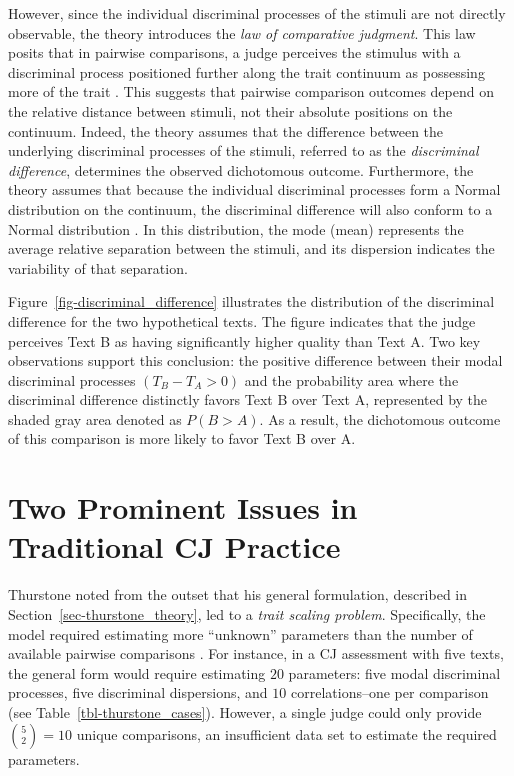 \documentclass[
  authoryear,
  review,
  1p]{elsarticle}
\begin{document}
However, since the individual discriminal processes of the stimuli are
not directly observable, the theory introduces the \emph{law of
comparative judgment}. This law posits that in pairwise comparisons, a
judge perceives the stimulus with a discriminal process positioned
further along the trait continuum as possessing more of the trait
\citep{Bramley_2008}. This suggests that pairwise comparison outcomes
depend on the relative distance between stimuli, not their absolute
positions on the continuum. Indeed, the theory assumes that the
difference between the underlying discriminal processes of the stimuli,
referred to as the \emph{discriminal difference}, determines the
observed dichotomous outcome. Furthermore, the theory assumes that
because the individual discriminal processes form a Normal distribution
on the continuum, the discriminal difference will also conform to a
Normal distribution \citep{Andrich_1978}. In this distribution, the mode
(mean) represents the average relative separation between the stimuli,
and its dispersion indicates the variability of that separation.

Figure~\ref{fig-discriminal_difference} illustrates the distribution of
the discriminal difference for the two hypothetical texts. The figure
indicates that the judge perceives Text B as having significantly higher
quality than Text A. Two key observations support this conclusion: the
positive difference between their modal discriminal processes
\((T_{B} - T_{A} > 0)\) and the probability area where the discriminal
difference distinctly favors Text B over Text A, represented by the
shaded gray area denoted as \(P(B > A)\). As a result, the dichotomous
outcome of this comparison is more likely to favor Text B over A.

\section{Two Prominent Issues in Traditional CJ
Practice}\label{sec-theory-issues}

Thurstone noted from the outset that his general formulation, described
in Section~\ref{sec-thurstone_theory}, led to a \emph{trait scaling
problem}. Specifically, the model required estimating more ``unknown''
parameters than the number of available pairwise comparisons
\citep{Thurstone_1927b}. For instance, in a CJ assessment with five
texts, the general form would require estimating \(20\) parameters: five
modal discriminal processes, five discriminal dispersions, and \(10\)
correlations--one per comparison (see Table~\ref{tbl-thurstone_cases}).
However, a single judge could only provide \({5 \choose 2} = 10\) unique
comparisons, an insufficient data set to estimate the required
parameters.
\end{document}
